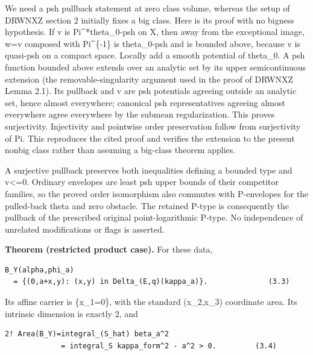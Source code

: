 \documentclass[11pt]{article}
\begin{document}
We need a psh pullback statement at zero class volume, whereas the setup of DRWNXZ section 2 initially fixes a big class. Here is its proof with no bigness hypothesis. If v is Pi\textasciicircum{}\allowbreak{}*theta\_\allowbreak{}0-\allowbreak{}psh on X, then away from the exceptional image, w=\allowbreak{}v composed with Pi\textasciicircum{}\allowbreak{}\{-\allowbreak{}1\} is theta\_\allowbreak{}0-\allowbreak{}psh and is bounded above, because v is quasi-\allowbreak{}psh on a compact space. Locally add a smooth potential of theta\_\allowbreak{}0. A psh function bounded above extends over an analytic set by its upper semicontinuous extension (the removable-\allowbreak{}singularity argument used in the proof of DRWNXZ Lemma 2.1). Its pullback and v are psh potentials agreeing outside an analytic set, hence almost everywhere; canonical psh representatives agreeing almost everywhere agree everywhere by the submean regularization. This proves surjectivity. Injectivity and pointwise order preservation follow from surjectivity of Pi. This reproduces the cited proof and verifies the extension to the present nonbig class rather than assuming a big-\allowbreak{}class theorem applies.

A surjective pullback preserves both inequalities defining a bounded type and v<=\allowbreak{}0. Ordinary envelopes are least psh upper bounds of their competitor families, so the proved order isomorphism also commutes with P-\allowbreak{}envelopes for the pulled-\allowbreak{}back theta and zero obstacle. The retained P-\allowbreak{}type is consequently the pullback of the prescribed original point-\allowbreak{}logarithmic P-\allowbreak{}type. No independence of unrelated modifications or flags is asserted.

\textbf{Theorem (restricted product case).} For these data,

\begin{Verbatim}[breaklines=true,fontsize=\small]
B_Y(alpha,phi_a)
  = {(0,a+x,y): (x,y) in Delta_(E,q)(kappa_a)}.              (3.3)
\end{Verbatim}

Its affine carrier is \{x\_\allowbreak{}1=\allowbreak{}0\}, with the standard (x\_\allowbreak{}2,x\_\allowbreak{}3) coordinate area. Its intrinsic dimension is exactly 2, and

\begin{Verbatim}[breaklines=true,fontsize=\small]
2! Area(B_Y)=integral_(S_hat) beta_a^2
             = integral_S kappa_form^2 - a^2 > 0.         (3.4)
\end{Verbatim}
\end{document}
